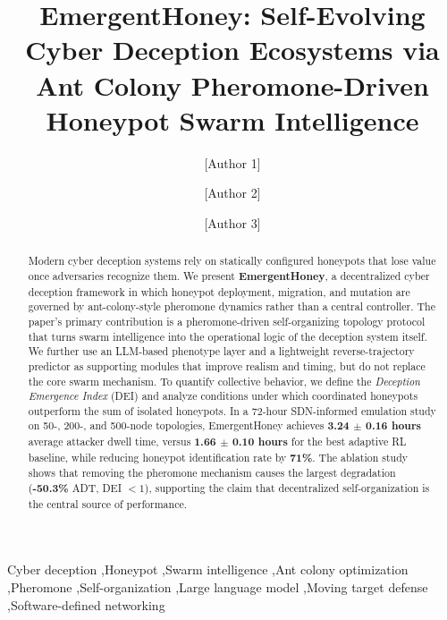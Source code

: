 \documentclass[review,3p,twocolumn]{elsarticle}
\begin{document}
\begin{frontmatter}

\title{EmergentHoney: Self-Evolving Cyber Deception Ecosystems via\\
Ant Colony Pheromone-Driven Honeypot Swarm Intelligence}

\author[inst1]{[Author 1]}
\author[inst1]{[Author 2]}
\author[inst2]{[Author 3]}

\address[inst1]{School of Computer Science, [University], China}
\address[inst2]{School of Cyber Security, [University], China}

\begin{abstract}
Modern cyber deception systems rely on statically configured honeypots that lose value once adversaries recognize them. We present \textbf{EmergentHoney}, a decentralized cyber deception framework in which honeypot deployment, migration, and mutation are governed by ant-colony-style pheromone dynamics rather than a central controller. The paper's primary contribution is a pheromone-driven self-organizing topology protocol that turns swarm intelligence into the operational logic of the deception system itself. We further use an LLM-based phenotype layer and a lightweight reverse-trajectory predictor as supporting modules that improve realism and timing, but do not replace the core swarm mechanism. To quantify collective behavior, we define the \emph{Deception Emergence Index} (DEI) and analyze conditions under which coordinated honeypots outperform the sum of isolated honeypots. In a 72-hour SDN-informed emulation study on 50-, 200-, and 500-node topologies, EmergentHoney achieves \textbf{3.24 $\pm$ 0.16 hours} average attacker dwell time, versus \textbf{1.66 $\pm$ 0.10 hours} for the best adaptive RL baseline, while reducing honeypot identification rate by \textbf{71\%}. The ablation study shows that removing the pheromone mechanism causes the largest degradation (\textbf{-50.3\%} ADT, DEI $< 1$), supporting the claim that decentralized self-organization is the central source of performance.
\end{abstract}

\begin{keyword}
Cyber deception \sep Honeypot \sep Swarm intelligence \sep Ant colony optimization \sep Pheromone \sep Self-organization \sep Large language model \sep Moving target defense \sep Software-defined networking
\end{keyword}

\end{frontmatter}
\end{document}

